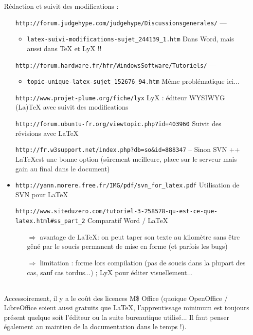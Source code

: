 \documentclass[11pt,twoside,a4paper]{article}
\begin{document}
R{\'e}daction et suivit des modifications : 
\begin{itemize}
	\item[] \texttt{http://forum.judgehype.com/judgehype/Discussionsgenerales/} --- 
	\begin{itemize}
		\item \texttt{latex-suivi-modifications-sujet\_244139\_1.htm} Dans Word, mais aussi dans TeX et LyX !!
	\end{itemize}
	\item[] \texttt{http://forum.hardware.fr/hfr/WindowsSoftware/Tutoriels/} --- 
	\begin{itemize}
		\item \texttt{topic-unique-latex-sujet\_152676\_94.htm} M{\^e}me probl{\'e}matique ici...
	\end{itemize}
	\item[] \texttt{http://www.projet-plume.org/fiche/lyx} LyX : {\'e}diteur WYSIWYG (La)TeX avec suivit des modifications
	\item[] \texttt{http://forum.ubuntu-fr.org/viewtopic.php?id=403960} Suivit des r{\'e}visions avec \LaTeX
	\item[] \texttt{http://fr.w3support.net/index.php?db=so\&id=888347} -- Sinon SVN ++ \LaTeX est une bonne option (s{\^u}rement meilleure, place sur le serveur mais gain au final dans le document)
	\item \texttt{http://yann.morere.free.fr/IMG/pdf/svn\_for\_latex.pdf} Utilisation de SVN pour LaTeX
	~\\
	\item[] \texttt{http://www.siteduzero.com/tutoriel-3-258578-qu-est-ce-que-latex.html\#ss\_part\_2} Comparatif Word / \LaTeX
	\begin{itemize}
		\item[$\Rightarrow$] avantage de \LaTeX : on peut taper son texte au kilom{\`e}tre sans {\^e}tre g{\^e}n{\'e} par le soucis permanent de mise en forme (et parfois les bugs)
		\item[$\Rightarrow$] limitation : forme lors compilation (pas de soucis dans la plupart des cas, sauf cas tordus...) ; LyX pour {\'e}diter visuellement...
	\end{itemize}
\end{itemize}~\\

Accessoirement, il y a le co{\^u}t des licences M\$ Office (quoique OpenOffice / LibreOffice soient aussi gratuits que \LaTeX, l'apprentissage minimum est toujours pr{\'e}sent quelque soit l'{\'e}diteur ou la suite bureautique utilis{\'e}... Il faut penser {\'e}galement au maintien de la documentation dans le temps !). 
\end{document}
